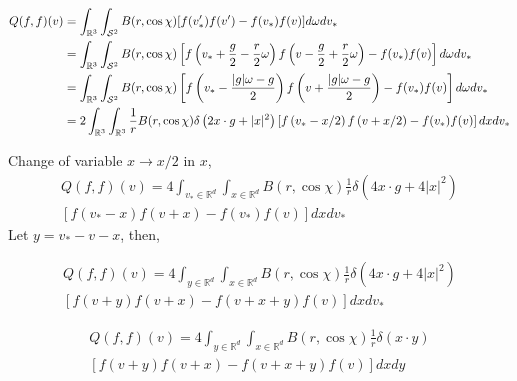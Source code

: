 \documentclass[11pt]{amsart}
\begin{document}

\begin{align}
\begin{split}
Q(f,f)(v) &=  \int_{\mathbb{R}^3} \int_{\mathcal{S}^2} {B}(r,\cos\chi)[f(v_*')f(v')-f(v_*)f(v)] d\omega dv_* \\
& =  \int_{\mathbb{R}^3} \int_{\mathcal{S}^2} {B}(r,\cos\chi) \left[ 
f \left(v_* + {g\over2} - {r\over2} \omega  \right)f \left(v - {g\over2} + {r\over2} \omega \right)  - f(v_*)f(v) \right]  d\omega dv_* \\
& =  \int_{\mathbb{R}^3} \int_{\mathcal{S}^2} {B}(r,\cos\chi) \left[ 
f \left(v_* - {|g|\omega - g\over 2}\right)f \left(v +  {|g|\omega - g\over 2}\right) -f(v_*)f(v)\right]  d\omega dv_* \\
& =  2\int_{\mathbb{R}^3} \int_{\mathbb{R}^3} {1\over r}{B}(r,\cos\chi) \delta\left( 2x\cdot g + |x|^2 \right) \left[ 
f \left(v_* - x/2\right)f \left(v + x/2\right) -f(v_*)f(v)\right]  dx dv_* \\
\end{split}
\end{align}

Change of variable $x \to x/2$ in $x$,
\begin{multline}
Q(f, f)(v) =4 \int_{v_{*} \in \mathbb{R}^{d}} \int_{x \in \mathbb{R}^{d}} B\left(r,\cos\chi\right) \frac{1}{r} \delta\left(4 x \cdot g+4|x|^{2}\right) \\
 \left[f\left(v_{*}-x\right) f(v+x)-f\left(v_{*}\right) f(v)\right] d x d v_{*}
\end{multline}
Let $y = v_* - v - x$, then, 

\begin{multline*}
Q(f, f)(v) =4 \int_{y \in \mathbb{R}^{d}} \int_{x \in \mathbb{R}^{d}} B\left(r,\cos\chi\right) \frac{1}{r} \delta\left(4 x \cdot g+4|x|^{2}\right) \\
 \left[f\left(v+y\right) f(v+x)-f\left(v+x+y\right) f(v)\right] d x d v_{*}
\end{multline*}

\begin{multline*}
Q(f, f)(v) =4 \int_{y \in \mathbb{R}^{d}} \int_{x \in \mathbb{R}^{d}} B\left(r,\cos\chi\right) \frac{1}{r} \delta\left(x \cdot y\right) \\
 \left[f\left(v+y\right) f(v+x)-f\left(v+x+y\right) f(v)\right] d x d y
\end{multline*}
\end{document}
